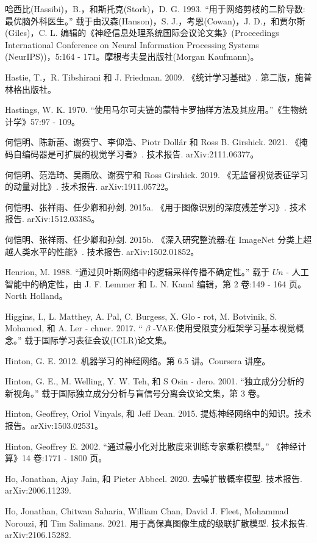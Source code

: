 \documentclass[10pt]{article}
\begin{document}
哈西比(Hassibi)，B.，和斯托克(Stork)，D. G. 1993. “用于网络剪枝的二阶导数:最优脑外科医生。” 载于由汉森(Hanson)，S. J.，考恩(Cowan)，J. D.，和贾尔斯(Giles)，C. L. 编辑的《神经信息处理系统国际会议论文集》(Proceedings International Conference on Neural Information Processing Systems (NeurIPS))，5:164 - 171。摩根考夫曼出版社(Morgan Kaufmann)。

Hastie, T.，R. Tibshirani 和 J. Friedman. 2009. 《统计学习基础》. 第二版，施普林格出版社。

Hastings, W. K. 1970. “使用马尔可夫链的蒙特卡罗抽样方法及其应用。”《生物统计学》57:97 - 109。

何恺明、陈新蕾、谢赛宁、李仰浩、Piotr Dollár 和 Ross B. Girshick. 2021. 《掩码自编码器是可扩展的视觉学习者》. 技术报告. arXiv:2111.06377。

何恺明、范浩琦、吴雨欣、谢赛宁和 Ross Girshick. 2019. 《无监督视觉表征学习的动量对比》. 技术报告. arXiv:1911.05722。

何恺明、张祥雨、任少卿和孙剑. 2015a. 《用于图像识别的深度残差学习》. 技术报告. arXiv:1512.03385。

何恺明、张祥雨、任少卿和孙剑. 2015b. 《深入研究整流器:在 ImageNet 分类上超越人类水平的性能》. 技术报告. arXiv:1502.01852。

Henrion, M. 1988. “通过贝叶斯网络中的逻辑采样传播不确定性。” 载于 \({Un}\) - 人工智能中的确定性，由 J. F. Lemmer 和 L. N. Kanal 编辑，第 2 卷:149 - 164 页。North Holland。

Higgins, I., L. Matthey, A. Pal, C. Burgess, X. Glo - rot, M. Botvinik, S. Mohamed, 和 A. Ler - chner. 2017. “ \(\beta\) -VAE:使用受限变分框架学习基本视觉概念。” 载于国际学习表征会议(ICLR)论文集。

Hinton, G. E. 2012. 机器学习的神经网络。第 6.5 讲。Coursera 讲座。

Hinton, G. E., M. Welling, Y. W. Teh, 和 S Osin - dero. 2001. “独立成分分析的新视角。” 载于国际独立成分分析与盲信号分离会议论文集，第 3 卷。

Hinton, Geoffrey, Oriol Vinyals, 和 Jeff Dean. 2015. 提炼神经网络中的知识。技术报告。arXiv:1503.02531。

Hinton, Geoffrey E. 2002. “通过最小化对比散度来训练专家乘积模型。” 《神经计算》14 卷:1771 - 1800 页。

Ho, Jonathan, Ajay Jain, 和 Pieter Abbeel. 2020. 去噪扩散概率模型. 技术报告. arXiv:2006.11239.

Ho, Jonathan, Chitwan Saharia, William Chan, David J. Fleet, Mohammad Norouzi, 和 Tim Salimans. 2021. 用于高保真图像生成的级联扩散模型. 技术报告. arXiv:2106.15282.
\end{document}
